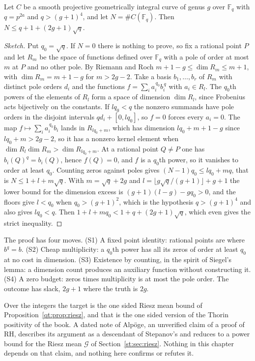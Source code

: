 \begin{theorem}\label{st:thm:bombieri}
Let $C$ be a smooth projective geometrically integral curve of genus $g$ over $\mathbb F_q$ with $q=p^{2a}$ and $q>(g+1)^4$, and let $N=\#C(\mathbb F_q)$. Then $N\le q+1+(2g+1)\sqrt q$.
\end{theorem}
\begin{proof}[Sketch]
Put $q_0=\sqrt q$. If $N=0$ there is nothing to prove, so fix a rational point $P$ and let $R_m$ be the space of functions defined over $\mathbb F_q$ with a pole of order at most $m$ at $P$ and no other pole. By Riemann and Roch $m+1-g\le\dim R_m\le m+1$, with $\dim R_m=m+1-g$ for $m>2g-2$. Take a basis $b_1,\dots,b_r$ of $R_m$ with distinct pole orders $d_i$ and the functions $f=\sum_ia_i^{\,q_0}b_i^{\,q}$ with $a_i\in R_l$. The $q_0$th powers of the elements of $R_l$ form a space of dimension $\dim R_l$, since Frobenius acts bijectively on the constants. If $lq_0<q$ the nonzero summands have pole orders in the disjoint intervals $qd_i+[0,lq_0]$, so $f=0$ forces every $a_i=0$. The map $f\mapsto\sum_ia_i^{\,q_0}b_i$ lands in $R_{lq_0+m}$, which has dimension $lq_0+m+1-g$ since $lq_0+m>2g-2$, so it has a nonzero kernel element when $\dim R_l\dim R_m>\dim R_{lq_0+m}$. At a rational point $Q\ne P$ one has $b_i(Q)^q=b_i(Q)$, hence $f(Q)=0$, and $f$ is a $q_0$th power, so it vanishes to order at least $q_0$. Counting zeros against poles gives $(N-1)q_0\le lq_0+mq$, that is $N\le1+l+m\sqrt q$. With $m=\sqrt q+2g$ and $l=\lfloor g\sqrt q/(g+1)\rfloor+g+1$ the lower bound for the dimension excess is $(g+1)(l-g)-gq_0>0$, and the floors give $l<q_0$ when $q_0>(g+1)^2$, which is the hypothesis $q>(g+1)^4$ and also gives $lq_0<q$. Then $1+l+mq_0<1+q+(2g+1)\sqrt q$, which even gives the strict inequality.
\end{proof}
The proof has four moves. (S1) A fixed point identity: rational points are where $b^q=b$. (S2) Cheap multiplicity: a $q_0$th power has all its zeros of order at least $q_0$ at no cost in dimension. (S3) Existence by counting, in the spirit of Siegel's lemma: a dimension count produces an auxiliary function without constructing it. (S4) A zero budget: zeros times multiplicity is at most the pole order. The outcome has slack, $2g+1$ where the truth is $2g$.

Over the integers the target is the one sided Riesz mean bound of Proposition~\ref{qt:prop:riesz}, and that is the one sided version of the Thorin positivity of the book. A dated note of Alp\"oge, an unverified claim of a proof of RH, describes its argument as a descendant of Stepanov's and reduces to a power bound for the Riesz mean $\mathcal G$ of Section~\ref{st:sec:riesz}. Nothing in this chapter depends on that claim, and nothing here confirms or refutes it.

